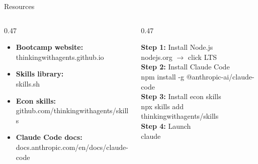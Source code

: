 \documentclass[aspectratio=169, 10pt]{beamer}
\begin{document}
\begin{frame}{Resources}
\begin{columns}[T]
\begin{column}{0.47\textwidth}
\begin{tcolorbox}[keybox, title={\faLink\quad Links}]
\small
\begin{itemize}\setlength{\itemsep}{4pt}
  \item \textbf{Bootcamp website:}\\{\scriptsize\ttfamily thinkingwithagents.github.io}
  \item \textbf{Skills library:}\\{\scriptsize\ttfamily skills.sh}
  \item \textbf{Econ skills:}\\{\scriptsize\ttfamily github.com/thinkingwithagents/skills}
  \item \textbf{Claude Code docs:}\\{\scriptsize\ttfamily docs.anthropic.com/en/docs/claude-code}
\end{itemize}
\end{tcolorbox}
\end{column}
\begin{column}{0.47\textwidth}
\begin{tcolorbox}[keybox, title={\faTerminal\quad Install Commands}]
\small
\textbf{Step 1:} Install Node.js\\
{\scriptsize\ttfamily nodejs.org} $\rightarrow$ click LTS\\[4pt]
\textbf{Step 2:} Install Claude Code\\
{\scriptsize\ttfamily npm install -g @anthropic-ai/claude-code}\\[4pt]
\textbf{Step 3:} Install econ skills\\
{\scriptsize\ttfamily npx skills add thinkingwithagents/skills}\\[4pt]
\textbf{Step 4:} Launch\\
{\scriptsize\ttfamily claude}
\end{tcolorbox}
\end{column}
\end{columns}
\end{frame}
\end{document}
